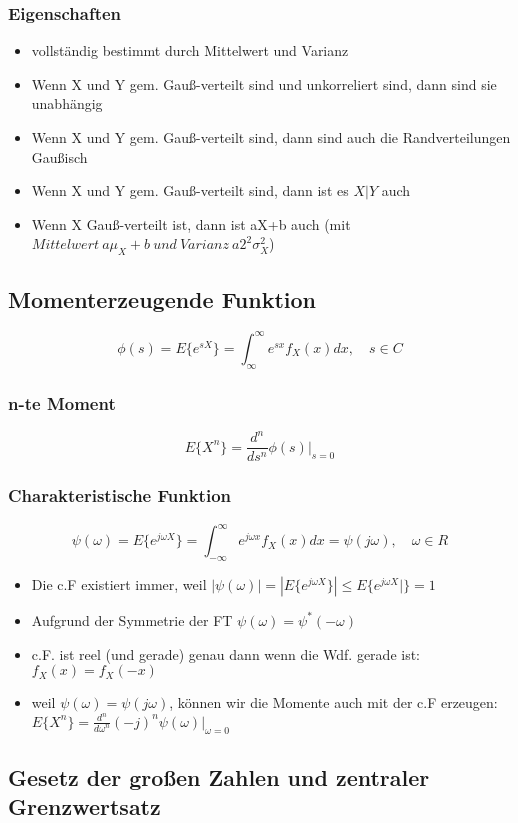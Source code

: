 \documentclass{article}
\begin{document}
\subsubsection{Eigenschaften}
\begin{itemize}
\item vollständig bestimmt durch Mittelwert und Varianz
\item Wenn X und Y gem. Gau\ss-verteilt sind und unkorreliert sind, dann sind sie unabhängig
\item Wenn X und Y gem. Gau\ss-verteilt sind, dann sind auch die Randverteilungen Gau\ss isch
\item Wenn X und Y gem. Gau\ss-verteilt sind, dann ist es $X|Y$ auch
\item Wenn X Gau\ss-verteilt ist, dann ist aX+b auch (mit $ Mittelwert \: a\mu_X + b \: und \: Varianz \: a2^2\sigma_X^2$)

\end{itemize}
\subsection{Momenterzeugende Funktion}
$$\phi(s) = E\{e^{sX}\} = \int_{\infty}^{\infty}e^{sx} f_X(x) dx,\quad s \in C $$
\subsubsection{n-te Moment}
$$E\{X^n\} = \frac{d^n}{ds^n} \phi(s)|_{s=0}$$
\subsubsection{Charakteristische Funktion}
$$\psi(\omega) = E\{e^{j\omega X}\} = \int_{-\infty}^{\infty} e^{j\omega x}f_X(x) dx =  \psi(j\omega), \quad \omega \in R$$
\begin {itemize}
\item  Die c.F existiert immer, weil $|\psi(\omega)| = |E\{ e^{j\omega X}\}| \le E\{e^{j\omega X}|\} = 1$
\item Aufgrund der Symmetrie der FT $\psi(\omega) = \psi^*(-\omega)$
\item c.F. ist reel (und gerade) genau dann wenn die Wdf. gerade ist: $f_X(x) = f_X(-x)$
\item weil $\psi(\omega) = \psi(j\omega)$, können wir die Momente auch mit der c.F erzeugen: $E\{X^n\} = \frac{d^n}{d\omega^n}(-j)^n\psi(\omega)|_{\omega = 0}$
\end{itemize}
\subsection{Gesetz der gro\ss en Zahlen und zentraler Grenzwertsatz}
\end{document}
